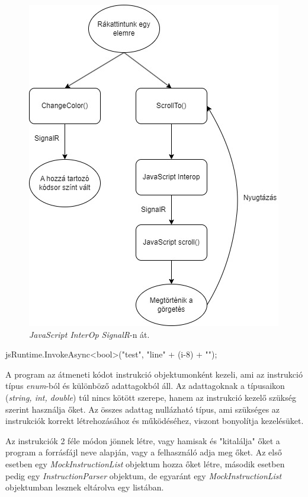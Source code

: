 \begin{figure}[h]
\centering
\includegraphics[scale=0.85]{images/JSpl.jpg}
\caption{\textit{JavaScript InterOp SignalR}-n át.}
\label{fig:jspl}
\end{figure}

\begin{cpp}
jsRuntime.InvokeAsync<bool>("test", "line{" + (i-8) + "}");
\end{cpp}

\newpage

A program az átmeneti kódot instrukció objektumonként kezeli, ami az instrukció típus \textit{enum}-ból és különböző adattagokból áll. Az adattagoknak a típusaikon (\textit{string, int, double}) túl nincs kötött szerepe, hanem az instrukció kezelő szükség szerint használja őket. Az összes adattag nullázható típus, ami szükséges az instrukciók korrekt létrehozásához és működéséhez, viszont bonyolítja kezelésüket.

Az instrukciók 2 féle módon jönnek létre, vagy hamisak és "kitalálja" őket a program a forrásfájl neve alapján, vagy a felhasználó adja meg őket. Az első esetben egy \textit{MockInstructionList} objektum hozza őket létre, második esetben pedig egy \textit{InstructionParser} objektum, de egyaránt egy \textit{MockInstructionList} objektumban lesznek eltárolva egy listában.


